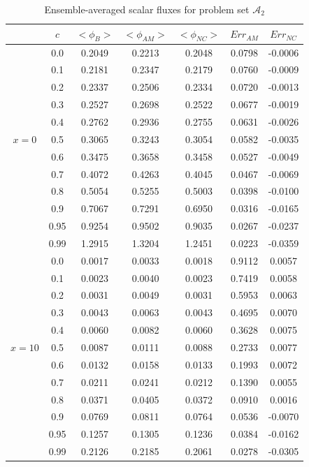 \documentclass[12pt]{article}
\newcommand{\bl}{\big<}
\newcommand{\bg}{\big>}
\newcommand{\seta}{\mathcal{A}}
\begin{document}
{\begin{table}[p]
\centering
\caption{Ensemble-averaged scalar fluxes for problem set $\seta_2$}
\label{tab3} 
\begin{tabular}{||c|c||c|c|c||c|c||} \hline \hline
  & $c$ & $\bl\phi_B\bg$ & $\bl\phi_{AM}\bg$ &$\bl\phi_{NC}\bg$ & $Err_{AM}$ & $ Err_{NC}$\\ \hline\hline
&0.0 & 0.2049 & 0.2213 & 0.2048 & 0.0798 & -0.0006 \\
\cline{2-7}
& 0.1 & 0.2181 & 0.2347 & 0.2179 & 0.0760 & -0.0009 \\
\cline{2-7}
& 0.2 & 0.2337 & 0.2506 & 0.2334 & 0.0720 & -0.0013 \\
\cline{2-7}
& 0.3 & 0.2527 & 0.2698 & 0.2522 & 0.0677 & -0.0019 \\
\cline{2-7}
& 0.4 & 0.2762 & 0.2936 & 0.2755 & 0.0631 & -0.0026 \\
\cline{2-7}
$x=0$ & 0.5 & 0.3065 & 0.3243 & 0.3054 & 0.0582 & -0.0035 \\
\cline{2-7}
& 0.6 & 0.3475 & 0.3658 & 0.3458 & 0.0527 & -0.0049\\
\cline{2-7}
& 0.7 & 0.4072 & 0.4263 & 0.4045 & 0.0467 & -0.0069 \\
\cline{2-7}
& 0.8 & 0.5054 & 0.5255 & 0.5003 & 0.0398 & -0.0100\\
\cline{2-7}
& 0.9 & 0.7067 & 0.7291 & 0.6950 & 0.0316 & -0.0165\\
\cline{2-7}
& 0.95 & 0.9254 & 0.9502 & 0.9035 & 0.0267 & -0.0237 \\
\cline{2-7}
& 0.99 & 1.2915 & 1.3204 & 1.2451 & 0.0223 & -0.0359 \\
\hline\hline
& 0.0 & 0.0017 & 0.0033 & 0.0018 & 0.9112 & 0.0057 \\
\cline{2-7}
& 0.1 & 0.0023 & 0.0040 & 0.0023 & 0.7419 & 0.0058 \\
\cline{2-7}
& 0.2 & 0.0031 & 0.0049 & 0.0031 & 0.5953 & 0.0063 \\
\cline{2-7}
& 0.3 & 0.0043 & 0.0063 & 0.0043 & 0.4695 & 0.0070 \\
\cline{2-7}
& 0.4 & 0.0060 & 0.0082 & 0.0060 & 0.3628 & 0.0075 \\
\cline{2-7}
$x=10$ & 0.5 & 0.0087 & 0.0111 & 0.0088 & 0.2733 & 0.0077 \\
\cline{2-7}
& 0.6 & 0.0132 & 0.0158 & 0.0133 & 0.1993 & 0.0072 \\
\cline{2-7}
& 0.7 & 0.0211 & 0.0241 & 0.0212 & 0.1390 & 0.0055 \\
\cline{2-7}
& 0.8 & 0.0371 & 0.0405 & 0.0372 & 0.0910 & 0.0016 \\
\cline{2-7}
& 0.9 & 0.0769 & 0.0811 & 0.0764 & 0.0536 & -0.0070 \\
\cline{2-7}
& 0.95 & 0.1257 & 0.1305 & 0.1236 & 0.0384 & -0.0162 \\
\cline{2-7}
& 0.99 & 0.2126 & 0.2185 & 0.2061 & 0.0278 & -0.0305 \\
\hline\hline
  \end{tabular}
\end{table}





}
\end{document}
